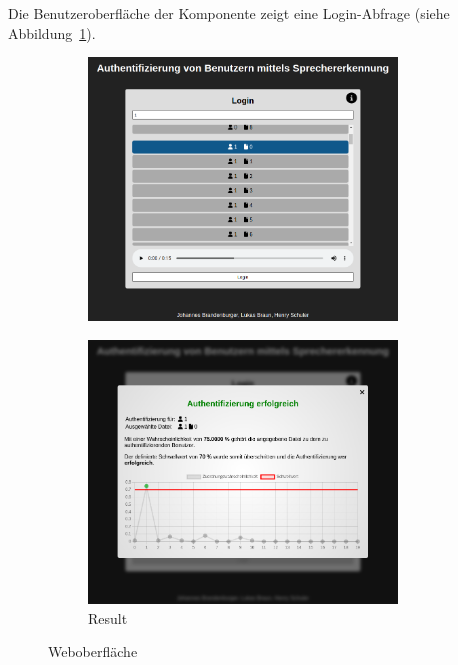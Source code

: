 Die Benutzeroberfläche der  Komponente zeigt eine Login-Abfrage (siehe Abbildung~\ref{fig:AppLogin}).
\begin{figure}[H]
    \begin{subfigure}[c]{0.49\textwidth}
        \centering
        \includegraphics[width=0.9\textwidth, keepaspectratio]{images/UI.png}
        \label{fig:AppLogin}
    \end{subfigure}
    \begin{subfigure}[c]{0.49\textwidth}
        \centering
        \includegraphics[width=0.9\textwidth, keepaspectratio]{images/UIResult.png}
        \caption{Result}
        \label{fig:Result}
    \end{subfigure}
    \caption{Weboberfläche}
\end{figure}
